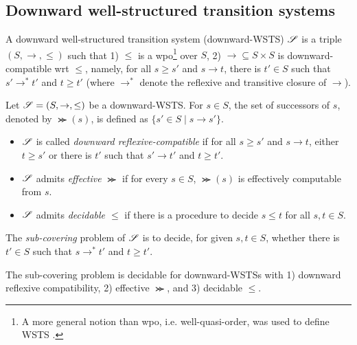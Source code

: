 
\subsection{Downward well-structured transition systems}

\begin{definition}
A downward well-structured transition system (downward-WSTS) $\mathscr{S}$ is a triple $(S, \rightarrow, \le)$ such that 1) $\le$ is a wpo\footnote{A more general notion than wpo, i.e. well-quasi-order, was used to define WSTS \cite{FS01}. } over $S$, 2) $\rightarrow \subseteq S \times S$ is downward-compatible wrt $\le$, namely, for all $s \ge s'$ and $s \rightarrow t$, there is $t' \in S$ such that $s' \rightarrow^* t'$ and $t \ge t'$ (where $ \rightarrow^*$ denote the reflexive and transitive closure of $\rightarrow$).
\end{definition}


Let $\mathscr{S} = (S, \rightarrow, \le)$ be a downward-WSTS. For $s \in S$, the set of successors of $s$, denoted by $\Succ(s)$, is defined as $\{s' \in S \mid s \rightarrow s'\}$.
\begin{itemize}
\item $\mathscr{S}$ is called \emph{downward reflexive-compatible} if for all $s \ge s'$ and $s \rightarrow t$, either $t \ge s'$ or there is $t'$ such that $s' \rightarrow t'$ and $t \ge t'$.
%
\item $\mathscr{S}$ admits \emph{effective} $\Succ$ if for every $s \in S$, $\Succ(s)$ is effectively computable from $s$.
%
\item $\mathscr{S}$ admits \emph{decidable $\le$} if there is a procedure to decide $s \le t$ for all $s, t \in S$.
%
\end{itemize}

The \emph{sub-covering} problem of $\mathscr{S}$ is to decide, for given $s, t \in S$, whether %
there is $t' \in S$ such that $s \rightarrow^* t'$ and $t \ge t'$.

\begin{theorem}\label{thm-dwsts}
The sub-covering problem is decidable for downward-WSTSs with 1) downward reflexive compatibility,  2) effective $\Succ$, and 3) decidable $\le$.
\end{theorem}



